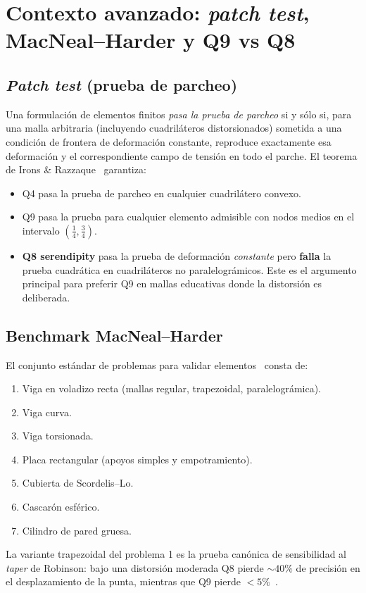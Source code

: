 \documentclass[11pt,a4paper]{article}
\begin{document}
\section{Contexto avanzado: \emph{patch test}, MacNeal--Harder y Q9 vs Q8}
\label{sec:patch}

\subsection{\emph{Patch test} (prueba de parcheo)}
Una formulaci\'on de elementos finitos \emph{pasa la prueba de parcheo} si y s\'olo si, para una malla arbitraria (incluyendo cuadril\'ateros distorsionados) sometida a una condici\'on de frontera de deformaci\'on constante, reproduce exactamente esa deformaci\'on y el correspondiente campo de tensi\'on en todo el parche. El teorema de Irons \& Razzaque~\cite{IronsRazzaque1972} garantiza:
\begin{itemize}[leftmargin=1.2em]
  \item Q4 pasa la prueba de parcheo en cualquier cuadril\'atero convexo.
  \item Q9 pasa la prueba para cualquier elemento admisible con nodos medios en el intervalo $(\tfrac{1}{4},\tfrac{3}{4})$.
  \item \textbf{Q8 serendipity} pasa la prueba de deformaci\'on \emph{constante} pero \textbf{falla} la prueba cuadr\'atica en cuadril\'ateros no paralelogr\'amicos. Este es el argumento principal para preferir Q9 en mallas educativas donde la distorsi\'on es deliberada.
\end{itemize}

\subsection{Benchmark MacNeal--Harder}
El conjunto est\'andar de problemas para validar elementos~\cite{MacNealHarder1985} consta de:
\begin{enumerate}[leftmargin=1.4em,itemsep=0pt]
  \item Viga en voladizo recta (mallas regular, trapezoidal, paralelogr\'amica).
  \item Viga curva.
  \item Viga torsionada.
  \item Placa rectangular (apoyos simples y empotramiento).
  \item Cubierta de Scordelis--Lo.
  \item Cascar\'on esf\'erico.
  \item Cilindro de pared gruesa.
\end{enumerate}
La variante trapezoidal del problema 1 es la prueba can\'onica de sensibilidad al \emph{taper} de Robinson: bajo una distorsi\'on moderada Q8 pierde $\sim 40\%$ de precisi\'on en el desplazamiento de la punta, mientras que Q9 pierde $<5\%$~\cite{LeeBathe1993}.
\end{document}
